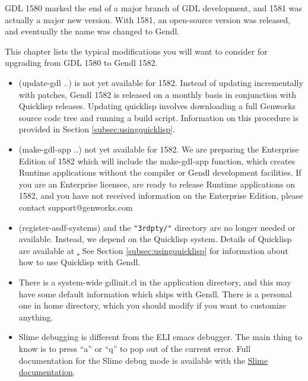 \documentclass [11pt]{book}
\begin{document}
\label{chap:upgradenotes}

GDL 1580 marked the end of a major branch of GDL development,
and 1581 was actually a major new version. With 1581, an open-source
version was released, and eventually the name was changed to
Gendl. 

This chapter lists the typical modifications you will want to consider
for upgrading from GDL 1580 to Gendl 1582.

\begin{itemize}

\item (update-gdl ..) is not yet available for 1582. Instead
of updating incrementally with patches, Gendl 1582 is released on a
monthly basis in conjunction with Quicklisp releases.  Updating
quicklisp involves downloading a full Genworks source code tree and
running a build script. Information on this procedure is provided in
Section 
\ref{subsec:usingquicklisp}.

\item (make-gdl-app ..) not yet available for 1582. We are
preparing the Enterprise Edition of 1582 which will include the
make-gdl-app function, which creates Runtime applications without the
compiler or Gendl development facilities.  If you are an Enterprise
licensee, are ready to release Runtime applications on 1582, and you
have not received information on the Enterprise Edition, please
contact support@genworks.com

\item (register-asdf-systems) and the \texttt{"3rdpty/"} directory are no longer needed or available. Instead, we depend on the Quicklisp
system. Details of Quicklisp are available at \href{http://www.quicklisp.org}. See Section 
\ref{subsec:usingquicklisp} for information about how to use Quicklisp with Gendl.

\item There is a system-wide gdlinit.cl in the application
       directory, and this may have some default information which
       ships with Gendl. There is a personal one in home directory,
       which you should modify if you want to customize anything.

\item Slime debugging is different from the ELI emacs debugger. The main thing to know is 
to press ``a'' or ``q'' to pop out of the current error. Full documentation for the Slime debug mode
is available with the \href{http://common-lisp.net/project/slime/doc/html/Debugger.html}{Slime documentation}.


\end{itemize}
\end{document}
